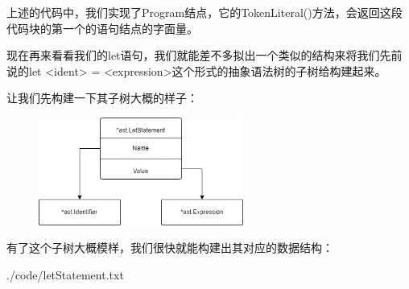 \documentclass{beamer}
\begin{document}
	\begin{frame}
		上述的代码中，我们实现了Program结点，它的TokenLiteral()方法，会返回这段代码块的第一个的语句结点的字面量。
		
		现在再来看看我们的let语句，我们就能差不多拟出一个类似的结构来将我们先前说的let <ident> = <expression>这个形式的抽象语法树的子树给构建起来。
		
		让我们先构建一下其子树大概的样子：
		
		\begin{figure}[h]
			\centering
			\includegraphics[width=0.6\textwidth]{pics/letStatement}
		\end{figure}
	\end{frame}

	\begin{frame}
		有了这个子树大概模样，我们很快就能构建出其对应的数据结构：
		
		
		{./code/letStatement.txt}
	\end{frame}
\end{document}
